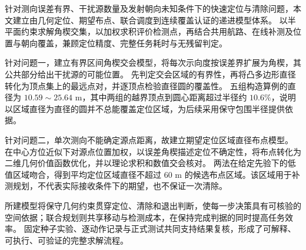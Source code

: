 针对测向误差有界、干扰源数量及发射朝向未知条件下的快速定位与清除问题，本文建立由几何定位、期望布点、联合调度到连续覆盖认证的递进模型体系。
以半平面约束求解角楔交集，以加权求积评价检测点，再结合共用航路、在线补测及位置与朝向覆盖，兼顾定位精度、完整任务耗时与无残留判定。

{\heiti 针对问题一}\songti，建立{\heiti 有界区间角楔交会模型}\songti，将每次示向度按误差界扩展为角楔，其公共部分给出干扰源的可能位置。
先判定交会区域的有界性，再将凸多边形直径转化为顶点集上的最远点对，并逐顶点检验直径圆的覆盖性。
五组构造算例的直径为 $10.59\sim25.64$ m，其中两组的越界顶点到圆心距离超过半径约 $10.6\%$，说明{\heiti 以区域直径为直径的圆并不总能覆盖定位区域}\songti，为后续采用保守包围半径提供依据。

{\heiti 针对问题二}\songti，单次测向不能确定源点距离，故建立{\heiti 期望定位区域直径布点模型}\songti。
在中心方位近似下对源点位置加权，以误差角楔描述定位不确定性，将布点转化为二维几何价值函数优化，并以理论求积和数值交会核对。
两法在给定先验下的低值区域吻合，得到{\heiti 平均定位区域直径不超过 60 m 的候选布点区域}\songti。该区域用于补测规划，不代表实际接收条件下的期望，也不保证一次清除。





所建模型将保守几何约束贯穿定位、清除和退出判断，使每一步决策具有可核验的空间依据；联合规划则共享移动与检测成本，在保持完成判据的同时提高任务效率。
固定种子实验、逐动作记录与正式测试共同支持结果复核，形成了可解释、可执行、可验证的完整求解流程。


